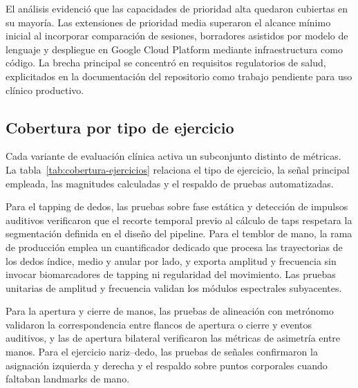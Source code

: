 El análisis evidenció que las capacidades de prioridad alta quedaron cubiertas en su mayoría. Las extensiones de prioridad media superaron el alcance mínimo inicial al incorporar comparación de sesiones, borradores asistidos por modelo de lenguaje y despliegue en Google Cloud Platform \citep{gcp} mediante infraestructura como código. La brecha principal se concentró en requisitos regulatorios de salud, explicitados en la documentación del repositorio como trabajo pendiente para uso clínico productivo.

\subsection{Cobertura por tipo de ejercicio}

Cada variante de evaluación clínica activa un subconjunto distinto de métricas. La tabla~\ref{tab:cobertura-ejercicios} relaciona el tipo de ejercicio, la señal principal empleada, las magnitudes calculadas y el respaldo de pruebas automatizadas.

Para el tapping de dedos, las pruebas sobre fase estática y detección de impulsos auditivos verificaron que el recorte temporal previo al cálculo de taps respetara la segmentación definida en el diseño del pipeline. Para el temblor de mano, la rama de producción emplea un cuantificador dedicado que procesa las trayectorias de los dedos índice, medio y anular por lado, y exporta amplitud y frecuencia sin invocar biomarcadores de tapping ni regularidad del movimiento. Las pruebas unitarias de amplitud y frecuencia validan los módulos espectrales subyacentes.

Para la apertura y cierre de manos, las pruebas de alineación con metrónomo validaron la correspondencia entre flancos de apertura o cierre y eventos auditivos, y las de apertura bilateral verificaron las métricas de asimetría entre manos. Para el ejercicio nariz--dedo, las pruebas de señales confirmaron la asignación izquierda y derecha y el respaldo sobre puntos corporales cuando faltaban landmarks de mano.

